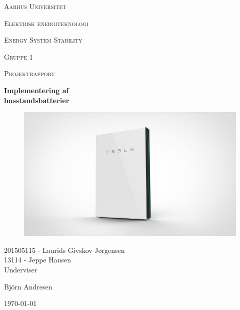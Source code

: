 \thispagestyle{empty}
	{\centering
	{\scshape\LARGE Aarhus Universitet \par}
	\vspace{1cm}
	{\scshape\Large Elektrisk energiteknologi\par}
	\vspace{0.5cm}
	{\scshape\Large Energy System Stability\par}
	{\scshape\Large Gruppe 1\par}
	{\scshape\Large Projektrapport\par}
	\vspace{1.5cm}
	{\huge\bfseries Implementering af\\ husstandsbatterier\par}
	\vspace{2cm}
	
	\begin{figure}[H] %
		\centering
		\includegraphics[width=1\textwidth]{figurer/Forside}
		\label{fig:Forside}
	\end{figure}

	{
	201505115 - Laurids Givskov Jørgensen\\
	13114 - Jeppe Hansen\\   }
	\vfill
	Underviser\par
	Björn Andresen

	\vfill

	{\large \today\par}
\par}